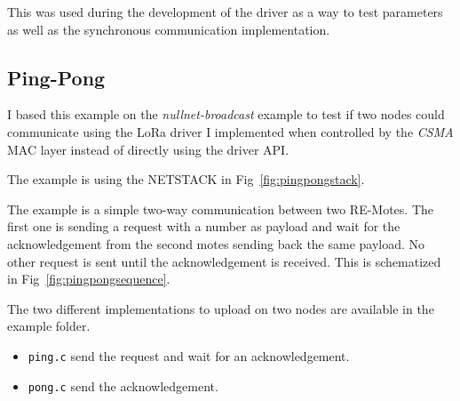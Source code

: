 This was used during the development of the driver as a way to test parameters
as well as the synchronous communication implementation.

\subsection{Ping-Pong}

I based this example on the \emph{nullnet-broadcast} example to test if two
nodes could communicate using the LoRa driver I implemented when controlled by
the \emph{CSMA} MAC layer instead of directly using the driver API\@.

The example is using the NETSTACK in Fig~\ref{fig:pingpongstack}.



The example is a simple two-way communication between two RE-Motes. 
The first one is sending a request with a number as
payload and wait for the acknowledgement from the second motes sending back
the same payload. 
No other request is sent until the acknowledgement is received.
This is schematized in Fig~\ref{fig:pingpongsequence}.

The two different implementations to upload on two nodes are available in the
example folder.

\begin{itemize}
  \item \lstinline{ping.c} send the request and wait for an acknowledgement.
  \item \lstinline{pong.c} send the acknowledgement.
\end{itemize}



